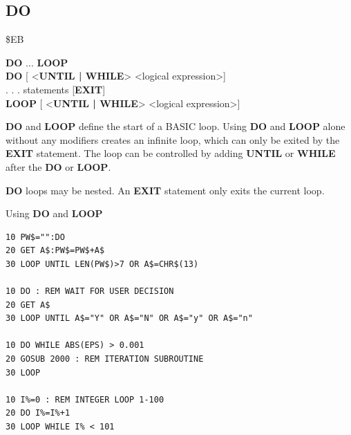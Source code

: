 \subsection{DO}
\begin{description}[leftmargin=2cm,style=nextline]
\item [Token:] \$EB
\item [Format:] {\bf DO} ... {\bf LOOP} \\
                {\bf DO} [ <{\bf UNTIL | WHILE}> <logical expression>] \\
                . . . statements [{\bf EXIT}] \\
                {\bf LOOP} [ <{\bf UNTIL | WHILE}> <logical expression>]
\item [Usage:] {\bf DO} and {\bf LOOP} define
               the start of a BASIC loop.
               Using {\bf DO} and {\bf LOOP} alone without any
               modifiers creates an infinite loop, which can only be exited
               by the {\bf EXIT} statement. The loop can be
               controlled by adding {\bf UNTIL} or {\bf WHILE}
               after the {\bf DO} or {\bf LOOP}.

\item [Remarks:] {\bf DO} loops may be nested. An {\bf EXIT} statement
               only exits the current loop.
\item [Examples:] Using {\bf DO} and {\bf LOOP}
\begin{tcolorbox}[colback=black,coltext=white]
\verbatimfont{\codefont}
\begin{verbatim}
10 PW$="":DO
20 GET A$:PW$=PW$+A$
30 LOOP UNTIL LEN(PW$)>7 OR A$=CHR$(13)

10 DO : REM WAIT FOR USER DECISION
20 GET A$
30 LOOP UNTIL A$="Y" OR A$="N" OR A$="y" OR A$="n"

10 DO WHILE ABS(EPS) > 0.001
20 GOSUB 2000 : REM ITERATION SUBROUTINE
30 LOOP

10 I%=0 : REM INTEGER LOOP 1-100
20 DO I%=I%+1
30 LOOP WHILE I% < 101
\end{verbatim}
\end{tcolorbox}
\end{description}


\newpage
